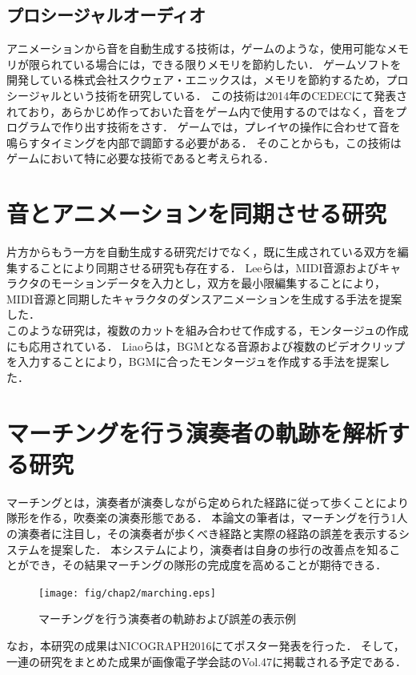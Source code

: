 \subsection{プロシージャルオーディオ}
アニメーションから音を自動生成する技術は，ゲームのような，使用可能なメモリが限られている場合には，できる限りメモリを節約したい．
ゲームソフトを開発している株式会社スクウェア・エニックスは，メモリを節約するため，プロシージャルという技術を研究している．
この技術は2014年のCEDEC\cite{SQUARE}にて発表されており，あらかじめ作っておいた音をゲーム内で使用するのではなく，音をプログラムで作り出す技術をさす．
ゲームでは，プレイヤの操作に合わせて音を鳴らすタイミングを内部で調節する必要がある．
そのことからも，この技術はゲームにおいて特に必要な技術であると考えられる．

\section{音とアニメーションを同期させる研究} \label{sec:synchronization}
片方からもう一方を自動生成する研究だけでなく，既に生成されている双方を編集することにより同期させる研究も存在する．
Leeら\cite{Lee}は，MIDI音源およびキャラクタのモーションデータを入力とし，双方を最小限編集することにより，MIDI音源と同期したキャラクタのダンスアニメーションを生成する手法を提案した．\\
\indent
このような研究は，複数のカットを組み合わせて作成する，モンタージュの作成にも応用されている．
Liaoら\cite{Liao}は，BGMとなる音源および複数のビデオクリップを入力することにより，BGMに合ったモンタージュを作成する手法を提案した．

\section{マーチングを行う演奏者の軌跡を解析する研究} \label{sec:marching}
マーチングとは，演奏者が演奏しながら定められた経路に従って歩くことにより隊形を作る，吹奏楽の演奏形態である．
本論文の筆者は，マーチングを行う1人の演奏者に注目し，その演奏者が歩くべき経路と実際の経路の誤差を表示するシステムを提案した．
本システムにより，演奏者は自身の歩行の改善点を知ることができ，その結果マーチングの隊形の完成度を高めることが期待できる．
\begin{figure}[h]
	\centering
	\texttt{[image: fig/chap2/marching.eps]}
	\caption{マーチングを行う演奏者の軌跡および誤差の表示例}
	\label{fig:marching}
\end{figure}
なお，本研究の成果はNICOGRAPH2016にてポスター発表\cite{NICOGRAPH}を行った．
そして，一連の研究をまとめた成果が画像電子学会誌のVol.47\cite{iieej}に掲載される予定である．

